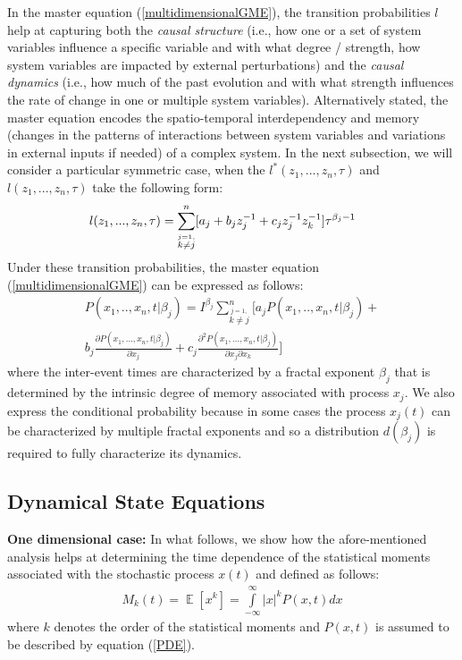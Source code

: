 In the master equation (\ref{multidimensionalGME}), the transition probabilities $l$ help at capturing both the \textit{causal structure} (i.e., how one or a set of system variables influence a specific variable and with what degree / strength, how system variables are impacted by external perturbations) and the \textit{causal dynamics} (i.e., how much of the past evolution and with what strength influences the rate of change in one or multiple system variables). Alternatively stated, the master equation encodes the spatio-temporal interdependency and memory (changes in the patterns of interactions between system variables and variations in external inputs if needed) of a complex system. In the next subsection, we will consider a particular symmetric case, when the $l^{*}(z_{1},...,z_{n},\tau)$ and $l(z_{1},...,z_{n},\tau)$ take the following form:
\begin{eqnarray}
\label{multidimensionalTP}
&  l(z_{1},...,z_{n},\tau)  =  \sum\limits_{ \stackrel{j=1,}{ k \neq j} }^{n} [ a_{j} + b_{j}z_{j}^{-1} + c_{j}z_{j}^{-1}z_{k}^{-1}  ] \tau^{\beta_{j}-1} \hspace{2mm} & 
\end{eqnarray}
Under these transition probabilities, the master equation (\ref{multidimensionalGME}) can be expressed as follows: 
\begin{eqnarray}
\label{multidimensionalGME2}
& P(x_{1},..,x_{n},t |\beta_{j}) = I^{\beta_{j}}  \sum\limits_{ \stackrel{j=1,}{ k \neq j} }^{n} [ a_{j} P(x_{1},..,x_{n},t |\beta_{j}) + & \nonumber \\
&  b_{j} \frac{\displaystyle \partial P(x_{1},...,x_{n},t | \beta_{j}) }{\displaystyle\partial x_{j} } + c_{j} \frac{\displaystyle \partial ^{2} P(x_{1},...,x_{n},t | \beta_{j}) }{\displaystyle\partial x_{j} \partial x_{k}} ]  & 
\end{eqnarray}
where the inter-event times are characterized by a fractal exponent $\beta_{j}$ that is determined by the intrinsic degree of memory associated with process $x_{j}$. We also express the conditional probability because in some cases the process $x_{j}(t)$ can be characterized by multiple fractal exponents and so a distribution $d(\beta_{j})$ is required to fully characterize its dynamics.
\subsection{Dynamical State Equations}
\label{StateEquations}

\textbf{One dimensional case:} In what follows, we show how the afore-mentioned analysis helps at determining the time dependence of the statistical moments associated with the stochastic process $x(t)$ and defined as follows:
\begin{eqnarray}
&M_{k}(t) =  \mathop{\mathbb{E}} [ x^{k} ]= \int\limits_{-\infty}^{\infty} \left|x\right|^{k} P(x,t)dx &
\end{eqnarray}
where $k$ denotes the order of the statistical moments and $P(x,t)$ is assumed to be described by equation (\ref{PDE}).

